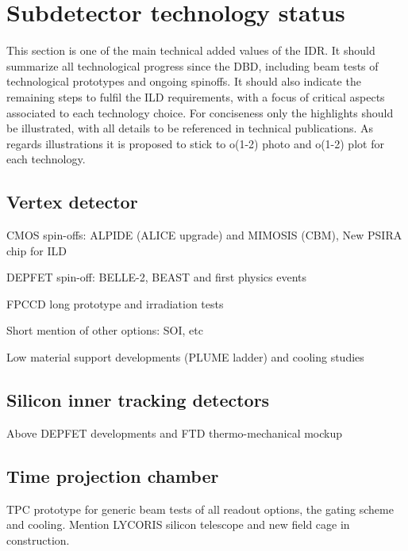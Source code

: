\section{Subdetector technology status}

This section is one of the main technical added values of the IDR. It should summarize all technological progress since the DBD, including beam tests of technological prototypes and ongoing spinoffs. It should also indicate the remaining steps to fulfil the ILD requirements, with a focus of critical aspects associated to each technology choice. For conciseness only the highlights should be illustrated, with all details to be referenced in technical publications. As regards illustrations it is proposed to stick to o(1-2) photo and o(1-2) plot  for each technology. 

\vspace{2cm}
\subsection{Vertex detector}

CMOS spin-offs: ALPIDE (ALICE upgrade) and MIMOSIS (CBM), New PSIRA chip for ILD

DEPFET spin-off: BELLE-2, BEAST and first physics events

FPCCD long prototype and irradiation tests

Short mention of other options:  SOI, etc

Low material support developments (PLUME ladder) and cooling studies

\vspace{2cm}
\subsection{Silicon inner tracking detectors}

Above DEPFET developments and FTD thermo-mechanical mockup

\vspace{2cm}
\subsection{Time projection chamber}

TPC prototype for generic beam tests of all readout options, the gating scheme and cooling. Mention LYCORIS silicon telescope and new field cage in construction.

